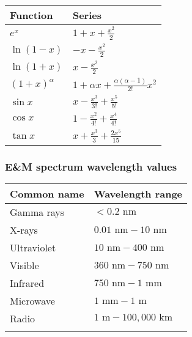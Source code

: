 \documentclass[11pt]{paper}
\begin{document}
\begin{longtable}{ll}
\textbf{Function}       & \textbf{Series}          \\ \hline
\multicolumn{1}{|l|}{$e^x$} & \multicolumn{1}{l|}{$1+x+\frac{x^2}{2}$} \\ \hline
\multicolumn{1}{|l|}{$\ln(1-x)$} & \multicolumn{1}{l|}{$-x-\frac{x^2}{2}$} \\ \hline
\multicolumn{1}{|l|}{$\ln(1+x)$} & \multicolumn{1}{l|}{$x-\frac{x^2}{2}$} \\ \hline
\multicolumn{1}{|l|}{$(1+x)^\alpha$} & \multicolumn{1}{l|}{$1+\alpha x +\frac{\alpha(\alpha-1)}{2!}x^2$} \\ \hline
\multicolumn{1}{|l|}{$\sin{x}$} & \multicolumn{1}{l|}{$x-\frac{x^3}{3!}+\frac{x^5}{5!}$} \\ \hline
\multicolumn{1}{|l|}{$\cos{x}$} & \multicolumn{1}{l|}{$1-\frac{x^2}{4!}+\frac{x^4}{4!}$} \\ \hline
\multicolumn{1}{|l|}{$\tan{x}$} & \multicolumn{1}{l|}{$x+\frac{x^3}{3}+\frac{2x^5}{15}$} \\ \hline
\end{longtable}
\newpage
\subsubsection*{E\&M spectrum wavelength values}
\label{subsec:spect}
\label{my-label}
\bgroup
\def\arraystretch{2}
\begin{longtable}{ll}
\textbf{Common name}       & \textbf{Wavelength range}          \\ \hline
\multicolumn{1}{|l|}{Gamma rays} & \multicolumn{1}{l|}{$<0.2\text{ nm}$} \\ \hline
\multicolumn{1}{|l|}{X-rays} & \multicolumn{1}{l|}{$0.01\text{ nm} - 10 \text{ nm}$} \\ \hline
\multicolumn{1}{|l|}{Ultraviolet} & \multicolumn{1}{l|}{$10\text{ nm} - 400\text{ nm}$} \\ \hline
\multicolumn{1}{|l|}{Visible} & \multicolumn{1}{l|}{$360\text{ nm} - 750\text{ nm}$} \\ \hline
\multicolumn{1}{|l|}{Infrared} & \multicolumn{1}{l|}{$750\text{ nm} - 1\text{ mm}$} \\ \hline
\multicolumn{1}{|l|}{Microwave} & \multicolumn{1}{l|}{$1\text{ mm} - 1 \text{ m}$} \\ \hline
\multicolumn{1}{|l|}{Radio} & \multicolumn{1}{l|}{$1\text{ m} - 100,000\text{ km}$} \\ \hline\\
\end{longtable}
\end{document}
